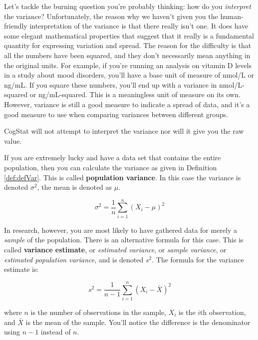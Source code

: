 \documentclass[
  11pt,
  a4paper,
  twoside,symmetric,openright]{book}
\theoremstyle{break}
\theoremstyle{break}
\begin{document}
Let's tackle the burning question you're probably thinking: how do you \emph{interpret} the variance? Unfortunately, the reason why we haven't given you the human-friendly interpretation of the variance is that there really isn't one. It does have some elegant mathematical properties that suggest that it really is a fundamental quantity for expressing variation and spread. The reason for the difficulty is that all the numbers have been squared, and they don't necessarily mean anything in the original units. For example, if you're running an analysis on vitamin D levels in a study about mood disorders, you'll have a base unit of measure of nmol/L or ng/mL. If you square these numbers, you'll end up with a variance in nmol/L-squared or ng/mL-squared. This is a meaningless unit of measure on its own. However, variance is still a good measure to indicate a spread of data, and it's a good measure to use when comparing variances between different groups.

CogStat will not attempt to interpret the variance nor will it give you the raw value.

\label{calloutVar}
\begin{callout}

\begin{keepTogether}
If you are extremely lucky and have a data set that contains the entire population, then you can calculate the variance as given in Definition \ref{def:defVar}. This is called \textbf{population variance}. In this case the variance is denoted \(\sigma^2\), the mean is denoted as \(\mu\).

\[
\sigma^2 = \frac{1}{n} \sum_{i=1}^n (X_i - \mu)^2
\]

\end{keepTogether}

\begin{keepTogether}
In research, however, you are most likely to have gathered data for merely a \emph{sample} of the population. There is an alternative formula for this case. This is called \textbf{variance estimate}, or \emph{estimated variance}, or \emph{sample variance}, or \emph{estimated population variance}, and is denoted \(s^2\). The formula for the variance estimate is:

\[
s^2 = \frac{1}{n-1} \sum_{i=1}^n (X_i - \bar{X})^2
\]

where \(n\) is the number of observations in the sample, \(X_i\) is the \(i\)th observation, and \(\bar{X}\) is the mean of the sample. You'll notice the difference is the denominator using \(n-1\) instead of \(n\).

\end{keepTogether}

\end{callout}
\end{document}
